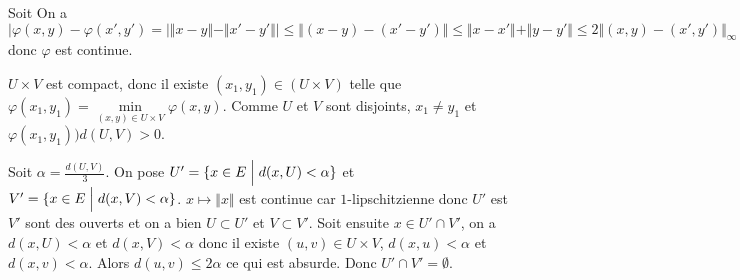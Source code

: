 \begin{solution}
	Soit 
	On a 
	$$\vert\varphi(x,y)-\varphi(x',y')=\vert\Vert x-y\Vert-\Vert x'-y'\Vert\vert\leqslant\Vert (x-y)-(x'-y')\Vert\leqslant\Vert x-x'\Vert+\Vert y-y'\Vert\leqslant2\Vert(x,y)-(x',y')\Vert_{\infty}$$
	donc $\varphi$ est continue.

	$U\times V$ est compact, donc il existe $(x_{1},y_{1})\in(U\times V)$ telle que $\varphi(x_{1},y_{1})=\min\limits_{(x,y)\in U\times V}\varphi(x,y)$. Comme $U$ et $V$ sont disjoints, $x_{1}\neq y_{1}$ et $\varphi(x_{1},y_{1}))d(U,V)>0$.

	Soit $\alpha=\frac{d(U,V)}{3}$. On pose $U'=\{x\in E\Bigm|d(x,U)<\alpha\}$ et $V'=\{x\in E\Bigm|d(x,V)<\alpha\}$. $x\mapsto\Vert x\Vert$ est continue car $1$-lipschitzienne donc $U'$ est $V'$ sont des ouverts et on a bien $U\subset U'$ et $V\subset V'$. Soit ensuite $x\in U'\cap V'$, on a $d(x,U)<\alpha$ et $d(x,V)<\alpha$ donc il existe $(u,v)\in U\times V$, $d(x,u)<\alpha$ et $d(x,v)<\alpha$. Alors $d(u,v)\leqslant2\alpha$ ce qui est absurde. Donc $U'\cap V'=\emptyset$.
\end{solution}

